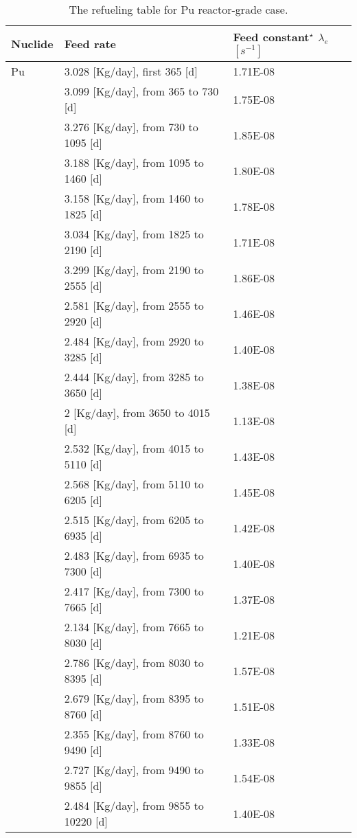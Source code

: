 \begin{table}[ht!]
	\centering
	\caption{The refueling table for Pu reactor-grade case.} 
	\vspace{1ex}
	\begin{tabularx}{\textwidth}{|p{1.5cm}|b|p{1.9cm}|}
		\hline
		\textbf{Nuclide} & \textbf{Feed rate} & \textbf{Feed constant$^{\star}$} $\lambda_{e}$ $[s^{-1}]$ \\
		\hline
		Pu        &  3.028 [Kg/day], first 365 [d] & 1.71E-08 \\
		&  3.099 [Kg/day], from 365 to 730 [d] & 		1.75E-08 \\
		&  3.276 [Kg/day], from 730 to 1095 [d] & 		1.85E-08 \\
		&  3.188 [Kg/day], from 1095 to 1460 [d]& 		1.80E-08	\\
		&  3.158 [Kg/day], from 1460 to 1825 [d] &		1.78E-08	\\
		& 3.034 [Kg/day], from 1825 to 2190 [d] &		1.71E-08	\\
		& 3.299   [Kg/day], from 2190 to 2555 [d] &	1.86E-08	\\
		&  2.581  [Kg/day], from 2555 to 2920 [d]&		1.46E-08		\\
		&  2.484  [Kg/day], from 2920 to 3285 [d]&		1.40E-08	 \\ 
		&  2.444  [Kg/day], from 3285 to 3650 [d]&		1.38E-08	 \\ 
		&   2 [Kg/day], from 3650 to 4015 [d]&		1.13E-08	 \\ 
		&  2.532  [Kg/day], from 4015 to 5110 [d]&		1.43E-08	 \\
		&  2.568  [Kg/day], from 5110 to 6205 [d]&		1.45E-08	 \\
		&  2.515  [Kg/day], from 6205 to 6935 [d]&		1.42E-08	 \\
		& 2.483 [Kg/day], from 6935 to 7300 [d]&		1.40E-08	 \\
		&  2.417  [Kg/day], from 7300 to 7665 [d]&		1.37E-08	 \\
		&  2.134  [Kg/day], from 7665 to 8030 [d]&		1.21E-08	 \\
		&  2.786  [Kg/day], from 8030 to 8395 [d]&		1.57E-08	 \\
		&   2.679 [Kg/day], from 8395 to 8760 [d]&		1.51E-08	 \\
		&  2.355   [Kg/day], from 8760 to 9490 [d]&		1.33E-08	 \\
		&  2.727  [Kg/day], from 9490 to 9855 [d]&		1.54E-08	 \\
		&  2.484  [Kg/day], from 9855 to 10220 [d]&		1.40E-08	 \\

\end{tabularx}
\end{table}
